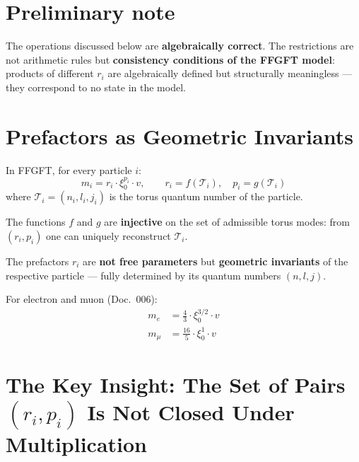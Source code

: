 
\section*{Preliminary note}

The operations discussed below are \textbf{algebraically correct}.
The restrictions are not arithmetic rules but
\textbf{consistency conditions of the FFGFT model}:
products of different $r_i$ are algebraically defined
but structurally meaningless --- they correspond to no state in the model.

\section{Prefactors as Geometric Invariants}

In FFGFT, for every particle $i$:
\begin{equation}
  m_i = r_i \cdot \xi_0^{p_i} \cdot v,
  \qquad r_i = f(\mathcal{T}_i), \quad p_i = g(\mathcal{T}_i)
\end{equation}
where $\mathcal{T}_i = (n_i, l_i, j_i)$ is the torus quantum number of the particle.

The functions $f$ and $g$ are \textbf{injective} on the set of admissible
torus modes: from $(r_i, p_i)$ one can uniquely reconstruct $\mathcal{T}_i$.

The prefactors $r_i$ are \textbf{not free parameters} but
\textbf{geometric invariants} of the respective particle ---
fully determined by its quantum numbers $(n,l,j)$.

For electron and muon (Doc.~006):
\begin{align}
  m_e &= \frac{4}{3} \cdot \xi_0^{3/2} \cdot v \label{eq:me}\\
  m_\mu &= \frac{16}{5} \cdot \xi_0^{1} \cdot v \label{eq:mmu}
\end{align}

\section{The Key Insight: The Set of Pairs \texorpdfstring{\texorpdfstring{$(r_i,p_i)$}{(ri,pi)}}{(ri,pi)} Is Not Closed Under Multiplication}

